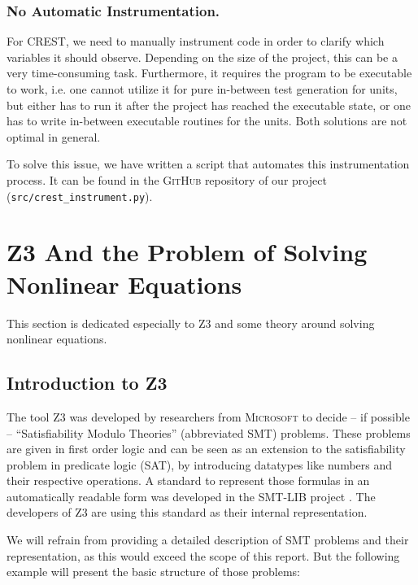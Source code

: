 \documentclass[oribibl, twocolumn]{llncs}
\begin{document}
\subsubsection{No Automatic Instrumentation.}

For \textsc{CREST}, we need to manually instrument code in order to
clarify which variables it should observe. Depending on the size of
the project, this can be a very time-consuming task.  Furthermore, it requires
the program to be executable to work, i.e. one cannot utilize it for
pure in-between test generation for units, but either has to run it after
the project has reached the executable state, or one has to write in-between executable routines for the units. Both solutions are not optimal in general.

To solve this issue, we have written a script that automates this instrumentation process. It can be found in the \textsc{GitHub} repository of our project (\texttt{src/crest\_instrument.py}).





\section{\textsc{Z3} And the Problem of Solving Nonlinear Equations}
\label{sctn:Z3}

This section is dedicated especially to \textsc{Z3} and some theory
around solving nonlinear equations.

\subsection{Introduction to Z3}
The tool \textsc{Z3} \cite{de2008z3}  was developed by researchers from \textsc{Microsoft} to decide -- if
possible -- ``Satisfiability Modulo Theories'' (abbreviated SMT)
problems. These problems are given in first order logic and can be
seen as an extension to the satisfiability problem in predicate logic
(SAT), by introducing datatypes like numbers and their respective
operations. A standard to represent those formulas in an automatically
readable form was developed in the \textsc{SMT-LIB} project  \cite{barrett2010smt}.
The developers of \textsc{Z3} are using this standard as their
internal representation.

We will refrain from providing a detailed description of SMT problems
and their representation, as this would exceed the scope of this
report. But the following example will present the basic structure of
those problems:
\end{document}
